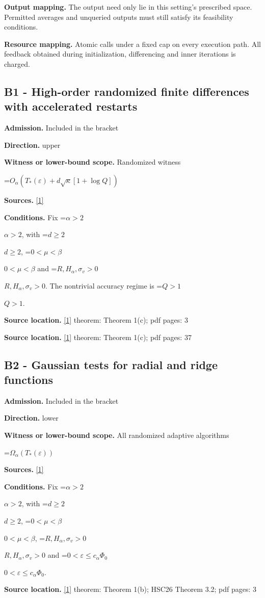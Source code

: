 \documentclass[10pt,a4paper]{article}
\newcommand{\AtlasMath}[1]{\par\begingroup\centering\setbox0=\hbox{$\displaystyle #1$}\ifdim\wd0>1.4\linewidth\typeout{ATLAS WIDE FORMULA: \the\wd0}\fi\ifdim\wd0>\linewidth\resizebox{\linewidth}{!}{\box0}\else\box0\fi\par\endgroup}
\newcommand{\AtlasInlineMath}[1]{\begingroup\setbox0=\hbox{$#1$}\ifdim\wd0>.4\linewidth\endgroup\AtlasMath{#1}\else\endgroup$#1$\fi}
\begin{document}
\textbf{Output mapping.} The output need only lie in this setting's prescribed space. Permitted averages and unqueried outputs must still satisfy its feasibility conditions.

\textbf{Resource mapping.} Atomic calls under a fixed cap on every execution path. All feedback obtained during initialization, differencing and inner iterations is charged.

\subsection{B1 - High-order randomized finite differences with accelerated restarts}
\textbf{Admission.} Included in the bracket

\textbf{Direction.} upper

\textbf{Witness or lower-bound scope.} Randomized witness

\AtlasMath{O_\alpha(T_*(\varepsilon)+d\sqrt\kappa[1+\log Q])}
\textbf{Sources.} \href{https://arxiv.org/pdf/2610.05517v2}{[1]}

\textbf{Conditions.} Fix \AtlasInlineMath{\alpha>2}, with \AtlasInlineMath{d\ge2}, \AtlasInlineMath{0<\mu<\beta} and \AtlasInlineMath{R,H_\alpha,\sigma_v>0}. The nontrivial accuracy regime is \AtlasInlineMath{Q>1}.

\textbf{Source location.} \href{https://arxiv.org/pdf/2610.05517v2}{[1]} theorem: Theorem 1(c); pdf pages: 3

\textbf{Source location.} \href{https://arxiv.org/pdf/2610.05517v2}{[1]} theorem: Theorem 1(c); pdf pages: 37

\subsection{B2 - Gaussian tests for radial and ridge functions}
\textbf{Admission.} Included in the bracket

\textbf{Direction.} lower

\textbf{Witness or lower-bound scope.} All randomized adaptive algorithms

\AtlasMath{\Omega_\alpha(T_*(\varepsilon))}
\textbf{Sources.} \href{https://arxiv.org/pdf/2610.05517v2}{[1]}

\textbf{Conditions.} Fix \AtlasInlineMath{\alpha>2}, with \AtlasInlineMath{d\ge2}, \AtlasInlineMath{0<\mu<\beta}, \AtlasInlineMath{R,H_\alpha,\sigma_v>0} and \AtlasInlineMath{0<\varepsilon\le c_\alpha\Phi_0}.

\textbf{Source location.} \href{https://arxiv.org/pdf/2610.05517v2}{[1]} theorem: Theorem 1(b); HSC26 Theorem 3.2; pdf pages: 3
\end{document}
